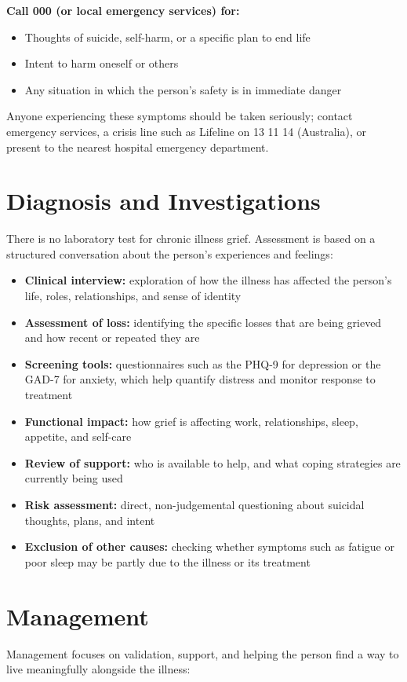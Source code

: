 \textbf{Call 000 (or local emergency services) for:}
\begin{itemize}
    \item Thoughts of suicide, self-harm, or a specific plan to end life
    \item Intent to harm oneself or others
    \item Any situation in which the person's safety is in immediate danger
\end{itemize}
Anyone experiencing these symptoms should be taken seriously; contact emergency services, a crisis line such as Lifeline on 13 11 14 (Australia), or present to the nearest hospital emergency department.

\section*{Diagnosis and Investigations}
There is no laboratory test for chronic illness grief. Assessment is based on a structured conversation about the person's experiences and feelings:

\begin{itemize}
    \item \textbf{Clinical interview:} exploration of how the illness has affected the person's life, roles, relationships, and sense of identity
    \item \textbf{Assessment of loss:} identifying the specific losses that are being grieved and how recent or repeated they are
    \item \textbf{Screening tools:} questionnaires such as the PHQ-9 for depression or the GAD-7 for anxiety, which help quantify distress and monitor response to treatment
    \item \textbf{Functional impact:} how grief is affecting work, relationships, sleep, appetite, and self-care
    \item \textbf{Review of support:} who is available to help, and what coping strategies are currently being used
    \item \textbf{Risk assessment:} direct, non-judgemental questioning about suicidal thoughts, plans, and intent
    \item \textbf{Exclusion of other causes:} checking whether symptoms such as fatigue or poor sleep may be partly due to the illness or its treatment
\end{itemize}

\section*{Management}
Management focuses on validation, support, and helping the person find a way to live meaningfully alongside the illness:

